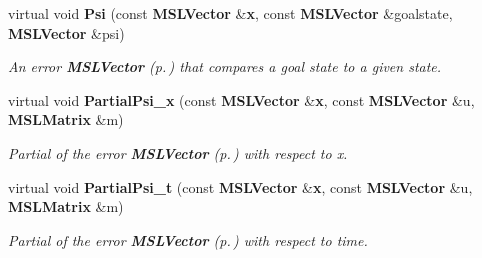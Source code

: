 \begin{CompactItemize}
virtual void {\bf Psi} (const {\bf MSLVector} \&{\bf x}, const {\bf MSLVector} \&goalstate, {\bf MSLVector} \&psi)
\begin{CompactList}\small\item\em An error {\bf MSLVector} {\rm (p.\,\pageref{classMSLVector})} that compares a goal state to a given state.\item\end{CompactList}\item 
virtual void {\bf Partial\-Psi\_\-x} (const {\bf MSLVector} \&{\bf x}, const {\bf MSLVector} \&u, {\bf MSLMatrix} \&m)
\begin{CompactList}\small\item\em Partial of the error {\bf MSLVector} {\rm (p.\,\pageref{classMSLVector})} with respect to x.\item\end{CompactList}\item 
virtual void {\bf Partial\-Psi\_\-t} (const {\bf MSLVector} \&{\bf x}, const {\bf MSLVector} \&u, {\bf MSLMatrix} \&m)
\begin{CompactList}\small\item\em Partial of the error {\bf MSLVector} {\rm (p.\,\pageref{classMSLVector})} with respect to time.\item\end{CompactList}\end{CompactItemize}
